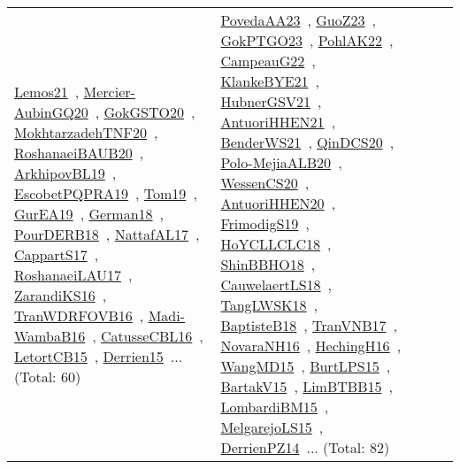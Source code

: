 {\begin{longtable}{lp{3cm}>{\raggedright\arraybackslash}p{6cm}>{\raggedright\arraybackslash}p{6cm}>{\raggedright\arraybackslash}p{8cm}}
\href{../works/Lemos21.pdf}{Lemos21}~\cite{Lemos21}, \href{../works/Mercier-AubinGQ20.pdf}{Mercier-AubinGQ20}~\cite{Mercier-AubinGQ20}, \href{../works/GokGSTO20.pdf}{GokGSTO20}~\cite{GokGSTO20}, \href{../works/MokhtarzadehTNF20.pdf}{MokhtarzadehTNF20}~\cite{MokhtarzadehTNF20}, \href{../works/RoshanaeiBAUB20.pdf}{RoshanaeiBAUB20}~\cite{RoshanaeiBAUB20}, \href{../works/ArkhipovBL19.pdf}{ArkhipovBL19}~\cite{ArkhipovBL19}, \href{../works/EscobetPQPRA19.pdf}{EscobetPQPRA19}~\cite{EscobetPQPRA19}, \href{../works/Tom19.pdf}{Tom19}~\cite{Tom19}, \href{../works/GurEA19.pdf}{GurEA19}~\cite{GurEA19}, \href{../works/German18.pdf}{German18}~\cite{German18}, \href{../works/PourDERB18.pdf}{PourDERB18}~\cite{PourDERB18}, \href{../works/NattafAL17.pdf}{NattafAL17}~\cite{NattafAL17}, \href{../works/CappartS17.pdf}{CappartS17}~\cite{CappartS17}, \href{../works/RoshanaeiLAU17.pdf}{RoshanaeiLAU17}~\cite{RoshanaeiLAU17}, \href{../works/ZarandiKS16.pdf}{ZarandiKS16}~\cite{ZarandiKS16}, \href{../works/TranWDRFOVB16.pdf}{TranWDRFOVB16}~\cite{TranWDRFOVB16}, \href{../works/Madi-WambaB16.pdf}{Madi-WambaB16}~\cite{Madi-WambaB16}, \href{../works/CatusseCBL16.pdf}{CatusseCBL16}~\cite{CatusseCBL16}, \href{../works/LetortCB15.pdf}{LetortCB15}~\cite{LetortCB15}, \href{../works/Derrien15.pdf}{Derrien15}~\cite{Derrien15}... (Total: 60) & \href{../works/PovedaAA23.pdf}{PovedaAA23}~\cite{PovedaAA23}, \href{../works/GuoZ23.pdf}{GuoZ23}~\cite{GuoZ23}, \href{../works/GokPTGO23.pdf}{GokPTGO23}~\cite{GokPTGO23}, \href{../works/PohlAK22.pdf}{PohlAK22}~\cite{PohlAK22}, \href{../works/CampeauG22.pdf}{CampeauG22}~\cite{CampeauG22}, \href{../works/KlankeBYE21.pdf}{KlankeBYE21}~\cite{KlankeBYE21}, \href{../works/HubnerGSV21.pdf}{HubnerGSV21}~\cite{HubnerGSV21}, \href{../works/AntuoriHHEN21.pdf}{AntuoriHHEN21}~\cite{AntuoriHHEN21}, \href{../works/BenderWS21.pdf}{BenderWS21}~\cite{BenderWS21}, \href{../works/QinDCS20.pdf}{QinDCS20}~\cite{QinDCS20}, \href{../works/Polo-MejiaALB20.pdf}{Polo-MejiaALB20}~\cite{Polo-MejiaALB20}, \href{../works/WessenCS20.pdf}{WessenCS20}~\cite{WessenCS20}, \href{../works/AntuoriHHEN20.pdf}{AntuoriHHEN20}~\cite{AntuoriHHEN20}, \href{../works/FrimodigS19.pdf}{FrimodigS19}~\cite{FrimodigS19}, \href{../works/HoYCLLCLC18.pdf}{HoYCLLCLC18}~\cite{HoYCLLCLC18}, \href{../works/ShinBBHO18.pdf}{ShinBBHO18}~\cite{ShinBBHO18}, \href{../works/CauwelaertLS18.pdf}{CauwelaertLS18}~\cite{CauwelaertLS18}, \href{../works/TangLWSK18.pdf}{TangLWSK18}~\cite{TangLWSK18}, \href{../works/BaptisteB18.pdf}{BaptisteB18}~\cite{BaptisteB18}, \href{../works/TranVNB17.pdf}{TranVNB17}~\cite{TranVNB17}, \href{../works/NovaraNH16.pdf}{NovaraNH16}~\cite{NovaraNH16}, \href{../works/HechingH16.pdf}{HechingH16}~\cite{HechingH16}, \href{../works/WangMD15.pdf}{WangMD15}~\cite{WangMD15}, \href{../works/BurtLPS15.pdf}{BurtLPS15}~\cite{BurtLPS15}, \href{../works/BartakV15.pdf}{BartakV15}~\cite{BartakV15}, \href{../works/LimBTBB15.pdf}{LimBTBB15}~\cite{LimBTBB15}, \href{../works/LombardiBM15.pdf}{LombardiBM15}~\cite{LombardiBM15}, \href{../works/MelgarejoLS15.pdf}{MelgarejoLS15}~\cite{MelgarejoLS15}, \href{../works/DerrienPZ14.pdf}{DerrienPZ14}~\cite{DerrienPZ14}... (Total: 82)\\

\end{longtable}}
